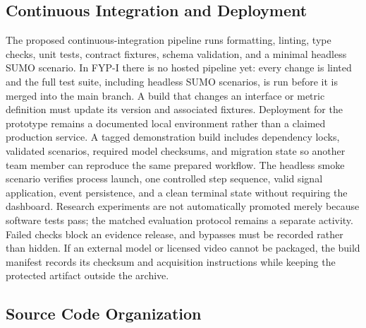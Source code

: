 \subsection{Continuous Integration and Deployment}

The proposed continuous-integration pipeline runs formatting, linting, type checks, unit tests, contract fixtures, schema validation, and a minimal headless SUMO scenario. In FYP-I there is no hosted pipeline yet: every change is linted and the full test suite, including headless SUMO scenarios, is run before it is merged into the main branch. A build that changes an interface or metric definition must update its version and associated fixtures. Deployment for the prototype remains a documented local environment rather than a claimed production service. A tagged demonstration build includes dependency locks, validated scenarios, required model checksums, and migration state so another team member can reproduce the same prepared workflow. The headless smoke scenario verifies process launch, one controlled step sequence, valid signal application, event persistence, and a clean terminal state without requiring the dashboard. Research experiments are not automatically promoted merely because software tests pass; the matched evaluation protocol remains a separate activity. Failed checks block an evidence release, and bypasses must be recorded rather than hidden. If an external model or licensed video cannot be packaged, the build manifest records its checksum and acquisition instructions while keeping the protected artifact outside the archive.

\subsection{Source Code Organization}
\label{sec:source-organization}

